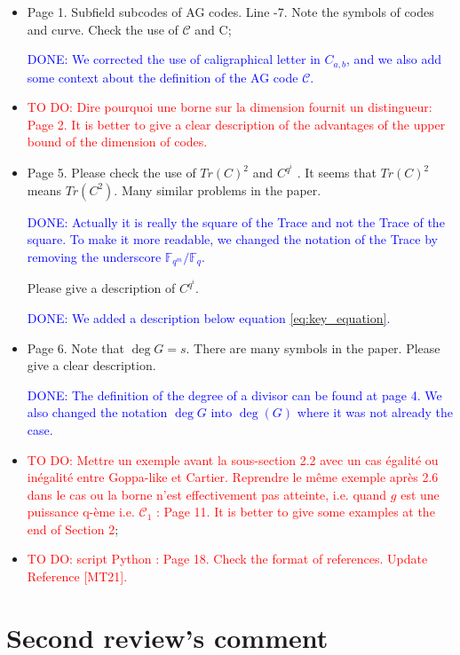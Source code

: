 \documentclass[12pt,a4paper]{amsart}
\newcommand\TODO[1]{\textcolor{red}{TO DO: #1}}
\newcommand\DONE[1]{\textcolor{blue}{DONE: #1}}
\begin{document}
\begin{itemize}
 
\item  Page 1. Subfield subcodes of AG codes. Line -7. Note the symbols of codes and curve. Check the use of $\mathcal{C}$ and C; 

\DONE{ We corrected the use of caligraphical letter in $C_{a,b}$, and we also add some context about the definition of the AG code $\mathcal{C}$.}
 
\item 
\TODO{Dire pourquoi une borne sur la dimension fournit un distingueur:  Page 2. It is better to give a clear description of the advantages of the upper bound of the dimension of codes.}


\item  Page 5. Please check the use of $Tr(C)^2$ and $ C^{q^i}$
. It seems that $Tr(C)^2$ means $Tr(C^2)$. Many similar problems in the paper.

\DONE{Actually it is really the square of the Trace and not the Trace of the square. To make it more readable, we changed the notation of the Trace by removing the underscore $\mathbb{F}_{q^m}/\mathbb{F}_q$.}

 Please give a description of $C^{q^i}$.
 
\DONE{We added a description below equation \eqref{eq:key_equation}.}

\item  Page 6. Note that $\deg G = s$. There are many symbols in the paper. Please give a clear description.

\DONE{The definition of the degree of a divisor can be found at page 4. We also changed the notation $\deg G$ into $\deg(G)$ where it was not already the case.}


\item  \TODO{Mettre un exemple avant la sous-section 2.2 avec un cas égalité ou inégalité entre Goppa-like et Cartier. Reprendre le même exemple après 2.6 dans le cas ou la borne n'est effectivement pas atteinte, i.e. quand $g$ est une puissance q-ème i.e. $\mathcal{C}_1$ : Page 11. It is better to give some examples at the end of Section 2};


\item  \TODO{script Python : Page 18. Check the format of references. Update Reference [MT21].}

\end{itemize} 


\section*{Second review's comment}
\end{document}
